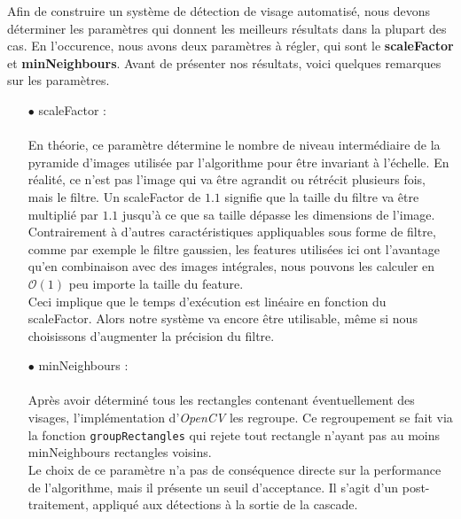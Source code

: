 \documentclass[a4paper,11pt]{article}
\begin{document}
        Afin de construire un système de détection de visage automatisé, nous devons déterminer les paramètres qui donnent les meilleurs résultats dans la plupart des cas.
        En l'occurence, nous avons deux paramètres à régler, qui sont le {\bf scaleFactor} et {\bf minNeighbours}.
        Avant de présenter nos résultats, voici quelques remarques sur les paramètres.\\
        \newpage
        \begin{itemize}
            \item[$\bullet$] scaleFactor :\\\\
                En théorie, ce paramètre détermine le nombre de niveau intermédiaire de la pyramide d'images utilisée par l'algorithme pour être invariant à l'échelle.
                En réalité, ce n'est pas l'image qui va être agrandit ou rétrécit plusieurs fois, mais le filtre.
                Un scaleFactor de $1.1$ signifie que la taille du filtre va être multiplié par $1.1$ jusqu'à ce que sa taille dépasse les dimensions de l'image.
                Contrairement à d'autres caractéristiques appliquables sous forme de filtre, comme par exemple le filtre gaussien, les features utilisées ici ont l'avantage qu'en combinaison avec des images intégrales, nous pouvons les calculer en $\mathcal{O}(1)$ peu importe la taille du feature.
                \\
                Ceci implique que le temps d'exécution est linéaire en fonction du scaleFactor.
                Alors notre système va encore être utilisable, même si nous choisissons d'augmenter la précision du filtre.\\
            \item[$\bullet$] minNeighbours :\\\\
                Après avoir déterminé tous les rectangles contenant éventuellement des visages, l'implémentation d'{\it OpenCV} les regroupe.
                Ce regroupement se fait via la fonction \verb!groupRectangles! qui rejete tout rectangle n'ayant pas au moins minNeighbours rectangles voisins.
                \\
                Le choix de ce paramètre n'a pas de conséquence directe sur la performance de l'algorithme, mais il présente un seuil d'acceptance.
                Il s'agit d'un post-traitement, appliqué aux détections à la sortie de la cascade.
        \end{itemize}
\end{document}
